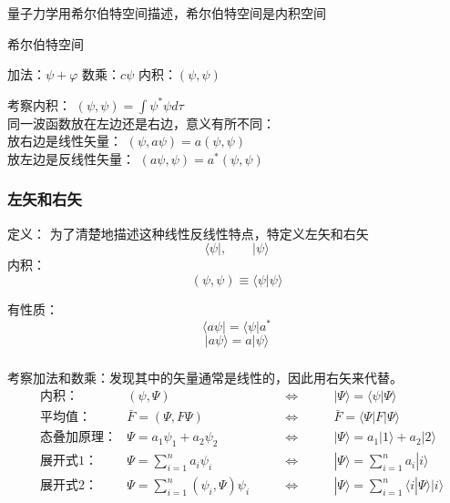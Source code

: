 \begin{frame}
    量子力学用希尔伯特空间描述，希尔伯特空间是内积空间
    \begin{tcolorbox1}{希尔伯特空间}
    \begin{itemize}
        \Item 加法：$\psi + \varphi$
        \Item 数乘：$c\psi$
        \Item 内积：$(\psi,\psi)$
    \end{itemize}
    \end{tcolorbox1}
    考察内积： $(\psi,\psi)=\int\psi^*\psi d\tau$ \\
    同一波函数放在左边还是右边，意义有所不同： \\
    放右边是线性矢量：  $(\psi,a\psi)=a (\psi,\psi)$ \\
    放左边是反线性矢量：   $(a\psi,\psi)=a^* (\psi,\psi)$   
\end{frame}

\begin{frame}
    \frametitle{左矢和右矢}
    \begin{tcolorbox1}{定义：}
    为了清楚地描述这种线性反线性特点，特定义左矢和右矢
    $$\langle \psi |, \qquad |\psi \rangle $$ 
    内积：\[(\psi,\psi)\equiv \langle \psi | \psi \rangle\]

    有性质： $$\langle a\psi | = \langle \psi |a^* $$
    $$ |a\psi \rangle = a|\psi \rangle$$ 
    \end{tcolorbox1}
\end{frame} 

\begin{frame}
    \frametitle{}
    考察加法和数乘：发现其中的矢量通常是线性的，因此用右矢来代替。\\
    $$\begin{aligned}
    &\text{内积：}   & (\psi,\Psi)  & \qquad\Leftrightarrow \qquad & | \Psi \rangle =\langle \psi | \Psi \rangle \\
    &\text{平均值：}   & \bar{F}=(\Psi,F\Psi)  & \qquad\Leftrightarrow \qquad & \bar{F} =\langle \Psi|F | \Psi \rangle \\
    &\text{态叠加原理：}   & \Psi=a_1 \psi_1+ a_2 \psi_2  & \qquad\Leftrightarrow \qquad &| \Psi \rangle =a_1 |1 \rangle+ a_2 |2 \rangle\\
    &\text{展开式1：}     & \Psi=\sum\limits_{i=1} ^n a_i \psi_i & \qquad \Leftrightarrow \qquad &| \Psi \rangle =\sum\limits_{i=1} ^n a_i |i \rangle\\
    &\text{展开式2：}     & \Psi=\sum\limits_{i=1} ^n (\psi_i ,\Psi) \psi_i & \qquad \Leftrightarrow \qquad &| \Psi \rangle =\sum\limits_{i=1} ^n \langle i | \Psi \rangle |i\rangle\\
    \end{aligned}
    $$
\end{frame} 
 
